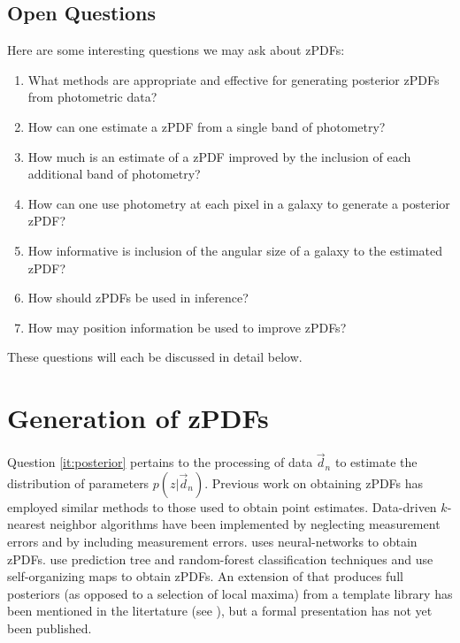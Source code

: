 \documentclass[12pt, onecolumn]{emulateapj}
\begin{document}
\subsection{Open Questions}

Here are some interesting questions we may ask about zPDFs:

\begin{enumerate}
\item \label{it:posterior} What methods are appropriate and effective for generating posterior zPDFs from photometric data?
\item \label{it:single} How can one estimate a zPDF from a single band of photometry?
\item \label{it:plus} How much is an estimate of a zPDF improved by the inclusion of each additional band of photometry? 
\item \label{it:pixel} How can one use photometry at each pixel in a galaxy to generate a posterior zPDF?
\item \label{it:spatial} How informative is inclusion of the angular size of a galaxy to the estimated zPDF?
\item \label{it:inference} How should zPDFs be used in inference?
\item \label{it:croscor} How may position information be used to improve zPDFs?
\end{enumerate}

These questions will each be discussed in detail below.

\section{Generation of zPDFs}

Question \ref{it:posterior} pertains to the processing of data $\vec{d}_{n}$ to estimate the distribution of parameters $p(z|\vec{d}_{n})$.  Previous work on obtaining zPDFs has employed similar methods to those used to obtain point estimates. Data-driven $k$-nearest neighbor algorithms have been implemented by \citet{she11} neglecting measurement errors and by \citet{bal08} including measurement errors.  \citet{bon13} uses neural-networks to obtain zPDFs.  \citet{car13} use prediction tree and random-forest classification techniques and \citet{car14} use self-organizing maps  to obtain zPDFs.  An extension of \citet{ben00} that produces full posteriors (as opposed to a selection of local maxima) from a template library has been mentioned in the litertature (see \citet{lop14}), but a formal presentation has not yet been published.
\end{document}

